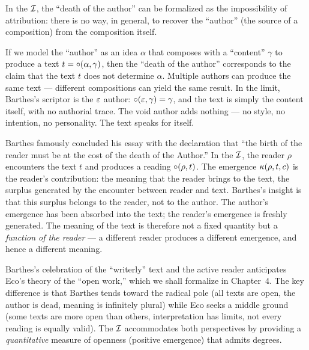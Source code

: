 In the $\mathcal{I}$, the ``death of the author'' can be formalized as the
impossibility of attribution: there is no way, in general, to recover
the ``author'' (the source of a composition) from the composition
itself.

\begin{remark}
If we model the ``author'' as an idea $\alpha$ that composes with a
``content'' $\gamma$ to produce a text $t = \circ(\alpha, \gamma)$,
then the ``death of the author'' corresponds to the claim that the
text $t$ does not determine $\alpha$. Multiple authors can produce
the same text --- different compositions can yield the same result.
In the limit, Barthes's scriptor is the $\varepsilon$ author:
$\circ(\varepsilon, \gamma) = \gamma$, and the text is simply the
content itself, with no authorial trace. The void author adds nothing
--- no style, no intention, no personality. The text speaks for itself.
\end{remark}

\begin{example}
Barthes famously concluded his essay with the declaration that ``the
birth of the reader must be at the cost of the death of the Author.''
In the $\mathcal{I}$, the reader $\rho$ encounters the text $t$ and produces
a reading $\circ(\rho, t)$. The emergence
$\kappa(\rho, t, c)$ is the reader's contribution: the meaning that
the reader brings to the text, the surplus generated by the encounter
between reader and text. Barthes's insight is that this surplus belongs
to the reader, not to the author. The author's emergence has been
absorbed into the text; the reader's emergence is freshly generated.
The meaning of the text is therefore not a fixed quantity but a
\emph{function of the reader} --- a different reader produces a
different emergence, and hence a different meaning.
\end{example}

\begin{remark}
Barthes's celebration of the ``writerly'' text and the active reader
anticipates Eco's theory of the ``open work,'' which we shall
formalize in Chapter~4. The key difference is that Barthes tends toward
the radical pole (all texts are open, the author is dead, meaning is
infinitely plural) while Eco seeks a middle ground (some texts are more
open than others, interpretation has limits, not every reading is
equally valid). The $\mathcal{I}$ accommodates both perspectives by providing
a \emph{quantitative} measure of openness (positive emergence) that
admits degrees.
\end{remark}

